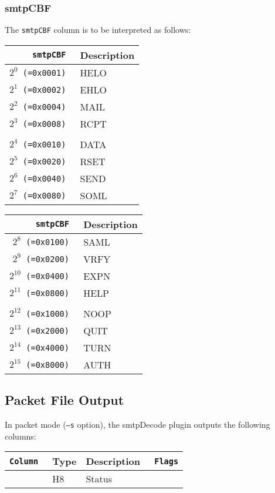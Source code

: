 \documentclass[documentation]{subfiles}
\begin{document}
\subsubsection{smtpCBF}\label{smtpCBF}
The {\tt smtpCBF} column is to be interpreted as follows:\\
\begin{minipage}{.48\textwidth}
    \begin{longtable}{>{\tt}rl}
        \toprule
        {\bf smtpCBF} & {\bf Description} \\
        \midrule\endhead%
        $2^{0}$  (=0x0001) & HELO\\
        $2^{1}$  (=0x0002) & EHLO\\
        $2^{2}$  (=0x0004) & MAIL\\
        $2^{3}$  (=0x0008) & RCPT\\
        \\
        $2^{4}$  (=0x0010) & DATA\\
        $2^{5}$  (=0x0020) & RSET\\
        $2^{6}$  (=0x0040) & SEND\\
        $2^{7}$  (=0x0080) & SOML\\
        \bottomrule
    \end{longtable}
\end{minipage}
\hfill
\begin{minipage}{.48\textwidth}
    \begin{longtable}{>{\tt}rl}
        \toprule
        {\bf smtpCBF} & {\bf Description} \\
        \midrule\endhead%
        $2^{8}$  (=0x0100) & SAML\\
        $2^{9}$  (=0x0200) & VRFY\\
        $2^{10}$ (=0x0400) & EXPN\\
        $2^{11}$ (=0x0800) & HELP\\
        \\
        $2^{12}$ (=0x1000) & NOOP\\
        $2^{13}$ (=0x2000) & QUIT\\
        $2^{14}$ (=0x4000) & TURN\\
        $2^{15}$ (=0x8000) & AUTH\\
        \bottomrule
    \end{longtable}
\end{minipage}

\subsection{Packet File Output}
In packet mode ({\tt --s} option), the smtpDecode plugin outputs the following columns:
\begin{longtable}{>{\tt}lll>{\tt\small}l}
    \toprule
    {\bf Column} & {\bf Type} & {\bf Description} & {\bf Flags}\\
    \midrule\endhead%
    \nameref{smtpStat} & H8 & Status & \\
    \bottomrule
\end{longtable}
\end{document}
